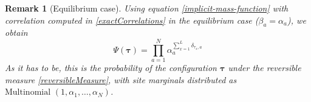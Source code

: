 \documentclass[10pt]{article}
\numberwithin{equation}{section}
\numberwithin{equation}{subsection}
\newtheorem{remark}{Remark}
\begin{document}
\begin{remark}[Equilibrium case]
	Using equation \eqref{implicit-mass-function} with correlation computed in \eqref{exactCorrelations} in the equilibrium case ($\beta_{a}=\alpha_{a}$), we obtain 
	\begin{equation}
		\Psi(\bm{\tau})=\prod_{a=1}^{N}\alpha_{a}^{\sum_{x=1}^{L}\delta_{\tau_{x},a}}
	\end{equation}
As it has to be, this is the probability of the configuration $\bm{\tau}$ under the reversible measure \eqref{reversibleMeasure}, with site marginals distributed as $\text{Multinomial }(1,\alpha_{1},\ldots,\alpha_{N})$. 
\end{remark}
\begin{comment}
\begin{remark}[Implicit form of $\Psi(\bm{\tau})$]
	The elements of the the vector $|\Psi\rangle$ can also be written as a linear combination of elements $\Psi^{'}(\bm{\tau})$ as 
	\begin{equation}\label{implicit-steadyState}
		\Psi(\bm{\tau})=\sum_{b=0}^{L}(-1)^{b}\sum_{1\leq q_{1}<\ldots<q_{b}\leq L}^{L}\left(\prod_{k=1}^{b}\delta_{\tau_{q_{k}},N}\right)\sum_{i_{q_{1}},\ldots i_{q_{b}}=1}^{N-1}\Psi^{'}(\tau_{1},\ldots,\underbrace{i_{q_{1}}}_{q_{1}},\ldots,\underbrace{i_{q_{b}}}_{q_{b}},\ldots,\tau_{L})
	\end{equation}
	where the notation
	\begin{equation}%
		\Psi^{'}(\tau_{1},\ldots,\underbrace{i_{q_{1}}}_{q_{1}},\ldots,\underbrace{i_{q_{b}}}_{q_{b}},\ldots,\tau_{L})
	\end{equation}
	means that, for all $b\in \{0,\ldots,L\}$ and for all $1\leq q_{1}<\ldots<q_{b}\leq L$,
	\begin{equation}
		\begin{cases}
			\tau_{x}=i_{x}\qquad &\text{if}\quad x\in\{q_{1},\ldots,q_{b}\}\\
			\tau_{x}=\tau_{x}\qquad &\text{if}\quad \text{otherwise}
		\end{cases}
	\end{equation}	
\end{remark}
\end{comment}
\end{document}

